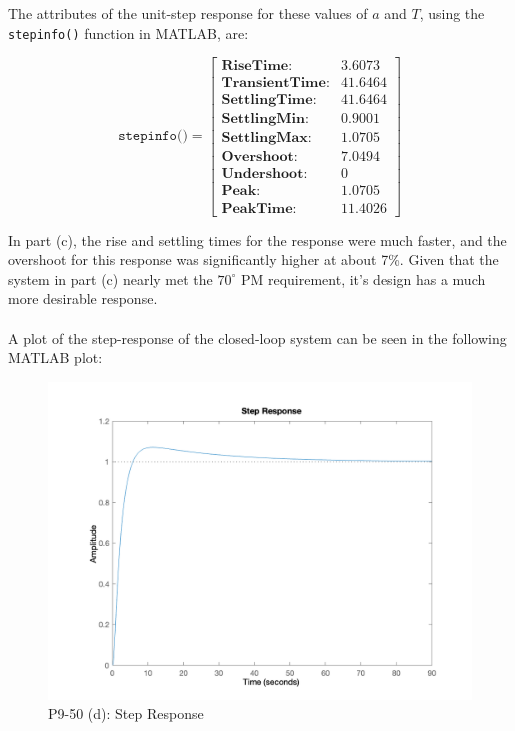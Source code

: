 \documentclass[12pt, letterpaper]{../assignment}
\begin{document}
The attributes of the unit-step response  for these values of $a$ and $T$,
using the \texttt{stepinfo()} function in MATLAB, are:

$$ \texttt{stepinfo()} =  \left[
\begin{array}{rl}
    \textbf{RiseTime:}& 3.6073\\
    \textbf{TransientTime:}&  41.6464\\
    \textbf{SettlingTime:}&  41.6464\\
    \textbf{SettlingMin:}&  0.9001\\
    \textbf{SettlingMax:}&  1.0705\\
    \textbf{Overshoot:}&  7.0494\\
    \textbf{Undershoot:}&  0\\
    \textbf{Peak:}&  1.0705\\
    \textbf{PeakTime:}&  11.4026
\end{array} \right] $$

In part (c), the rise and settling times for the response were much faster,
and the overshoot for this response was significantly higher at about 7\%.
Given that the system in part (c) nearly met the $70^\circ$ PM requirement,
it's design has a much more desirable response.
\\\\
A plot of the step-response of the closed-loop system can be seen in the following MATLAB plot:

\begin{figure}[H]
    \centering
    \includegraphics[width=1\linewidth]{./figures/step_9_50d.png}
    \caption{P9-50 (d): Step Response}
\end{figure}
\end{document}

